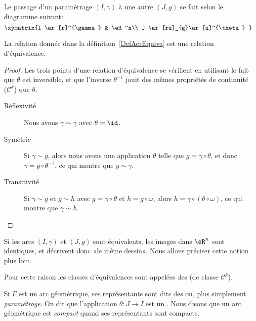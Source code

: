 Le passage d'un paramétrage \( (I,\gamma)\) à une autre \( (J,g)\) se fait selon le diagramme suivant:
\begin{equation}
	\xymatrix{%
		I \ar[r]^{\gamma}   &   \eR^n\\
		J \ar[ru]_{g}\ar[u]^{\theta}
	}
\end{equation}

\begin{proposition}
	La relation donnée dans la définition~\ref{DefAcrEquiva} est une relation d'équivalence.
\end{proposition}

\begin{proof}
	Les trois points d'une relation d'équivalence se vérifient en utilisant le fait que \( \theta\) est inversible, et que l'inverse \( \theta^{-1}\) jouit des mêmes propriétés de continuité (\( \mathcal{C}^k\)) que \( \theta\).
	\begin{description}
		\item[Réflexivité] Nous avons \( \gamma\sim \gamma\) avec \( \theta=\id\).
		\item[Symétrie] Si \( \gamma\sim g\), alors nous avons une application \( \theta\) telle que \( g=\gamma\circ\theta\), et donc \( \gamma=g\circ\theta^{-1}\), ce qui montre que \( g\sim \gamma\).
		\item[Transitivité] Si \( \gamma\sim g\) et \( g\sim h\) avec \( g=\gamma\circ\theta\) et \( h=g\circ\omega\), alors \( h=\gamma\circ(\theta\circ\omega)\), ce qui montre que \( \gamma\sim h\).
	\end{description}
\end{proof}
Si les arcs \( (I,\gamma)\) et \( (J,g)\) sont équivalents, les images dans \( \eR^n\) sont identiques, et décrivent donc «le même dessin». Nous allons préciser cette notion plus loin.

\begin{definition}
	Pour cette raison les classes d'équivalences sont appelées des  (de classe \( \mathcal{C}^k\)).
\end{definition}

Si \( \Gamma\) est un arc géométrique, ses représentants sont dits des  ou, plus simplement \emph{paramétrage}. On dit que l'application \( \theta\colon J\to I\) est un . Nous disons que un arc géométrique est \emph{compact} quand ses représentants sont compacts.


